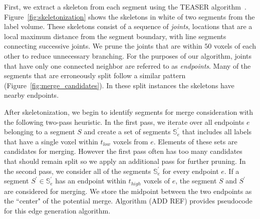 First, we extract a skeleton from each segment using the TEASER algorithm~\cite{sato2000teasar,zhao2014automatic}.
Figure~\ref{fig:skeletonization} shows the skeletons in white of two segments from the label volume.
These skeletons consist of a sequence of \textit{joints}, locations that are a local maximum distance from the segment boundary, with line segments connecting successive joints. 
We prune the joints that are within $50$ voxels of each other to reduce unnecessary branching.
For the purposes of our algorithm, joints that have only one connected neighbor are referred to as \textit{endpoints}. 
Many of the segments that are erroneously split follow a similar pattern (Figure~\ref{fig:merge_candidates}). 
In these split instances the skeletons have nearby endpoints.

After skeletonization, we begin to identify segments for merge consideration with the following two-pass heuristic.
In the first pass, we iterate over all endpoints $e$ belonging to a segment $S$ and create a set of segments $\mathbb{S}_e^\prime$ that includes all labels that have a single voxel within $t_{low}$ voxels from $e$. 
Elements of these sets are candidates for merging.
However the first pass often has too many candidates that should remain split so we apply an additional pass for further pruning.
In the second pass, we consider all of the segments $\mathbb{S}_e^\prime$ for every endpoint $e$. 
If a segment $S^\prime \in \mathbb{S}_e^\prime$ has an endpoint within $t_{high}$ voxels of $e$, the segment $S$ and $S^\prime$ are considered for merging. 
We store the midpoint between the two endpoints as the ``center" of the potential merge.
Algorithm (ADD REF) provides pseudocode for this edge generation algorithm. 

